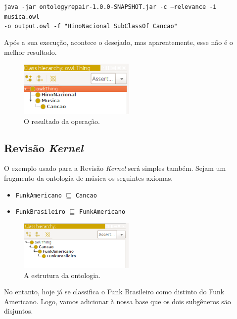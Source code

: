 \begin{small}
	\texttt{java -jar ontologyrepair-1.0.0-SNAPSHOT.jar -c --relevance -i musica.owl \\ -o output.owl -f "HinoNacional SubClassOf Cancao"}
\end{small}

Após a sua execução, acontece o desejado, mas aparentemente, esse não é o melhor resultado.

\begin{figure}[H]
	\centering
	\includegraphics[width=0.5\textwidth]{Capitulos/Implementacao/cpm2.png}
	\caption{O resultado da operação.}
\end{figure}

\subsection{Revisão \textit{Kernel}}

O exemplo usado para a Revisão \textit{Kernel} será simples também. Sejam um fragmento da ontologia de música os seguintes axiomas.

\begin{itemize}
	\item \texttt{FunkAmericano} $ \sqsubseteq $ \texttt{Cancao}
	\item \texttt{FunkBrasileiro} $ \sqsubseteq $ \texttt{FunkAmericano}
\end{itemize}

\begin{figure}[H]
	\centering
	\includegraphics[width=0.5\textwidth]{Capitulos/Implementacao/r1.png}
	\caption{A estrutura da ontologia.}
\end{figure}

No entanto, hoje já se classifica o Funk Brasileiro como distinto do Funk Americano. Logo, vamos adicionar à nossa base que os dois subgêneros são disjuntos.

